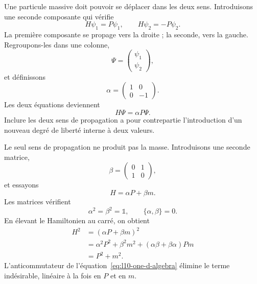Une particule massive doit pouvoir se déplacer dans les deux sens. Introduisons une seconde composante qui vérifie
\begin{equation}
H\psi_1=P\psi_1,
\qquad
H\psi_2=-P\psi_2.
\label{eq:l10-two-directions}
\end{equation}
La première composante se propage vers la droite ; la seconde, vers la gauche. Regroupons-les dans une colonne,
\begin{equation}
\Psi=
\begin{pmatrix}
\psi_1\\
\psi_2
\end{pmatrix},
\end{equation}
et définissons
\begin{equation}
\alpha=
\begin{pmatrix}
1&0\\
0&-1
\end{pmatrix}.
\end{equation}
Les deux équations deviennent
\begin{equation}
H\Psi=\alpha P\Psi.
\label{eq:l10-massless-one-d}
\end{equation}
Inclure les deux sens de propagation a pour contrepartie l’introduction d’un nouveau degré de liberté interne à deux valeurs.

Le seul sens de propagation ne produit pas la masse. Introduisons une seconde matrice,
\begin{equation}
\beta=
\begin{pmatrix}
0&1\\
1&0
\end{pmatrix},
\end{equation}
et essayons
\begin{equation}
H=\alpha P+\beta m.
\label{eq:l10-massive-one-d}
\end{equation}
Les matrices vérifient
\begin{equation}
\alpha^2=\beta^2=\mathbb{1},
\qquad
\{\alpha,\beta\}=0.
\label{eq:l10-one-d-algebra}
\end{equation}
En élevant le Hamiltonien au carré, on obtient
\begin{align}
H^2
&=(\alpha P+\beta m)^2\\
&=\alpha^2P^2+\beta^2m^2
  +(\alpha\beta+\beta\alpha)Pm\\
&=P^2+m^2.
\label{eq:l10-one-d-dispersion}
\end{align}
L’anticommutateur de l’équation~\eqref{eq:l10-one-d-algebra} élimine le terme indésirable, linéaire à la fois en \(P\) et en \(m\).

